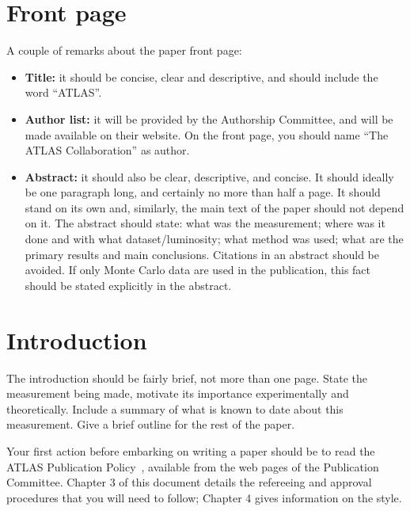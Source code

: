 \documentclass[UKenglish]{style/atlasdoc}
\author{ATLAS Publication Committee}
\begin{document}
\tableofcontents
\clearpage

\section{Front page}
\label{sec:front}

A couple of remarks about the paper front page:
\begin{itemize}

\item {\bf Title:} it should be concise, clear and descriptive, and
  should include the word ``ATLAS''.

\item {\bf Author list:} it will be provided by the Authorship
  Committee, and will be made available on their website. On the
  front page, you should name ``The ATLAS Collaboration'' as
  author.

\item {\bf Abstract:} it should also be clear, descriptive, and
  concise. It should ideally be one paragraph long, and certainly no
  more than half a page. It should stand on its own and, similarly,
  the main text of the paper should not depend on it. The abstract
  should state: what was the measurement; where was it done and with
  what dataset/luminosity; what method was used; what are the
  primary results and main conclusions.  Citations in an abstract
  should be avoided. If only Monte Carlo data are used in the
  publication, this fact should be stated explicitly in the
  abstract.  
  
\end{itemize}


\section{Introduction}
\label{sec:intro}

The introduction should be fairly brief, not more than one page.
State the measurement being made, motivate its importance
experimentally and theoretically. Include a summary of what is known
to date about this measurement. Give a brief outline for the rest of
the paper.

Your first action before embarking on writing a paper should be to
read the ATLAS Publication Policy~\cite{publication-policy}, available
from the web pages of the Publication Committee. Chapter 3 of this
document details the refereeing and approval procedures that you will
need to follow; Chapter 4 gives information on the style.
\end{document}
